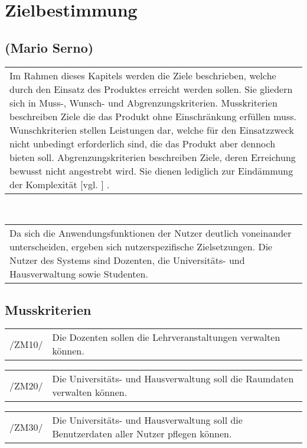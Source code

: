 \section{Zielbestimmung}
\label{sec:Zielbestimmung}

\subsection*{(Mario Serno)}

\begin{tabular}{p{16.5cm}}
Im Rahmen dieses Kapitels werden die Ziele beschrieben, welche durch den Einsatz des Produktes erreicht werden sollen. Sie gliedern sich in Muss-, Wunsch- und Abgrenzungskriterien. Musskriterien beschreiben Ziele die das Produkt ohne Einschränkung erfüllen muss. Wunschkriterien stellen Leistungen dar, welche für den Einsatzzweck nicht unbedingt erforderlich sind, die das Produkt aber dennoch bieten soll. Abgrenzungskriterien beschreiben Ziele, deren Erreichung bewusst nicht angestrebt wird. Sie dienen lediglich zur Eindämmung der Komplexität [vgl. \cite{balz1996}]  .
\end{tabular}\\[0.25cm]

\begin{tabular}{p{16.5cm}}
Da sich die Anwendungsfunktionen der Nutzer deutlich voneinander unterscheiden, ergeben sich nutzerspezifische Zielsetzungen. Die Nutzer des Systems sind Dozenten, die Universitäts- und Hausverwaltung sowie Studenten.
\end{tabular}

\subsection{Musskriterien}

\begin{tabular}{p{1.5cm}p{14.5cm}}	
	 /ZM10/& Die Dozenten sollen die Lehrveranstaltungen verwalten können. \\[0.25cm]
\end{tabular}

\begin{tabular}{p{1.5cm}p{14.5cm}}	
	 /ZM20/& Die Universitäts- und Hausverwaltung soll die Raumdaten verwalten können. \\[0.25cm]
\end{tabular}

\begin{tabular}{p{1.5cm}p{14.5cm}}	
	 /ZM30/& Die Universitäts- und Hausverwaltung soll die Benutzerdaten aller Nutzer pflegen können. \\[0.25cm]
\end{tabular}


